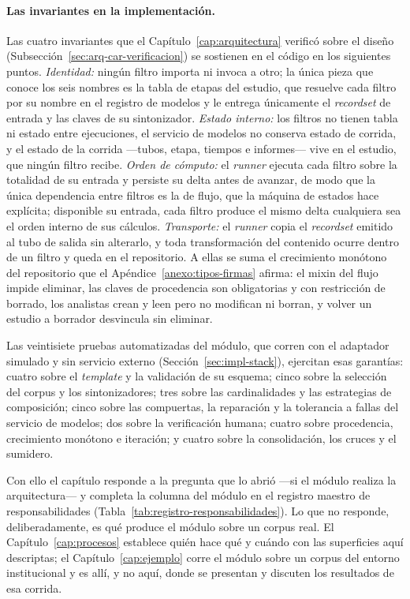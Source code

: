 \documentclass[12pt]{report}
\begin{document}
\paragraph{Las invariantes en la implementación.}
\label{sec:impl-invariantes}
Las cuatro invariantes que el Capítulo~\ref{cap:arquitectura} verificó sobre el diseño (Subsección~\ref{sec:arq-car-verificacion}) se sostienen en el código en los siguientes puntos. \textit{Identidad:} ningún filtro importa ni invoca a otro; la única pieza que conoce los seis nombres es la tabla de etapas del estudio, que resuelve cada filtro por su nombre en el registro de modelos y le entrega únicamente el \textit{recordset} de entrada y las claves de su sintonizador. \textit{Estado interno:} los filtros no tienen tabla ni estado entre ejecuciones, el servicio de modelos no conserva estado de corrida, y el estado de la corrida ---tubos, etapa, tiempos e informes--- vive en el estudio, que ningún filtro recibe. \textit{Orden de cómputo:} el \textit{runner} ejecuta cada filtro sobre la totalidad de su entrada y persiste su delta antes de avanzar, de modo que la única dependencia entre filtros es la de flujo, que la máquina de estados hace explícita; disponible su entrada, cada filtro produce el mismo delta cualquiera sea el orden interno de sus cálculos. \textit{Transporte:} el \textit{runner} copia el \textit{recordset} emitido al tubo de salida sin alterarlo, y toda transformación del contenido ocurre dentro de un filtro y queda en el repositorio. A ellas se suma el crecimiento monótono del repositorio que el Apéndice~\ref{anexo:tipos-firmas} afirma: el mixin del flujo impide eliminar, las claves de procedencia son obligatorias y con restricción de borrado, los analistas crean y leen pero no modifican ni borran, y volver un estudio a borrador desvincula sin eliminar.

\label{sec:impl-pruebas}
Las veintisiete pruebas automatizadas del módulo, que corren con el adaptador simulado y sin servicio externo (Sección~\ref{sec:impl-stack}), ejercitan esas garantías: cuatro sobre el \textit{template} y la validación de su esquema; cinco sobre la selección del corpus y los sintonizadores; tres sobre las cardinalidades y las estrategias de composición; cinco sobre las compuertas, la reparación y la tolerancia a fallas del servicio de modelos; dos sobre la verificación humana; cuatro sobre procedencia, crecimiento monótono e iteración; y cuatro sobre la consolidación, los cruces y el sumidero.

Con ello el capítulo responde a la pregunta que lo abrió ---si el módulo realiza la arquitectura--- y completa la columna del módulo en el registro maestro de responsabilidades (Tabla~\ref{tab:registro-responsabilidades}). Lo que no responde, deliberadamente, es qué produce el módulo sobre un corpus real. El Capítulo~\ref{cap:procesos} establece quién hace qué y cuándo con las superficies aquí descriptas; el Capítulo~\ref{cap:ejemplo} corre el módulo sobre un corpus del entorno institucional y es allí, y no aquí, donde se presentan y discuten los resultados de esa corrida.
\end{document}
